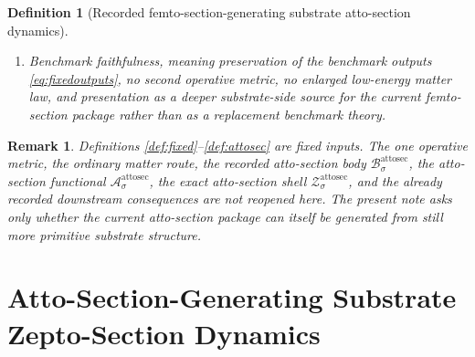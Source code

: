 \documentclass[11pt]{article}
\newcommand{\FemtoSectionShell}[1]{\mathcal Z_{#1}^{\mathrm{femtosec}}}
\newcommand{\AttoSectionBody}[1]{\mathcal B_{#1}^{\mathrm{attosec}}}
\newcommand{\AttoSectionProj}[1]{\Pi_{#1}^{\mathrm{attosec}}}
\newcommand{\AttoSectionFiber}[2]{\mathcal F_{#1}^{\mathrm{attosec}}(#2)}
\newcommand{\AttoSectionFunctional}[1]{\mathscr A_{#1}^{\mathrm{attosec}}}
\newcommand{\AttoSectionShell}[1]{\mathcal Z_{#1}^{\mathrm{attosec}}}
\newtheorem{definition}{Definition}
\newtheorem{remark}{Remark}
\begin{document}
\begin{definition}[Recorded femto-section-generating substrate atto-section dynamics]
\begin{enumerate}
\[\begin{array}{l}
    \AttoSectionFunctional{\sigma}(v)
    =
    \displaystyle\min_{w\in\AttoSectionFiber{\sigma}{\AttoSectionProj{\sigma}(v)}}
    \AttoSectionFunctional{\sigma}(w)
    \end{array}
    \right\},
    \]
    and
    \[
    \AttoSectionProj{\sigma}\big|_{\AttoSectionShell{\sigma}}
    :
    \AttoSectionShell{\sigma}
    \xrightarrow{\cong}
    \FemtoSectionShell{\sigma}
    \]
    is a diffeomorphism.
    \item Benchmark faithfulness, meaning preservation of the benchmark outputs \eqref{eq:fixedoutputs}, no second operative metric, no enlarged low-energy matter law, and presentation as a deeper substrate-side source for the current femto-section package rather than as a replacement benchmark theory.
\end{enumerate}
\end{definition}

\begin{remark}
Definitions \ref{def:fixed}--\ref{def:attosec} are fixed inputs. The one operative metric, the ordinary matter route, the recorded atto-section body \(\AttoSectionBody{\sigma}\), the atto-section functional \(\AttoSectionFunctional{\sigma}\), the exact atto-section shell \(\AttoSectionShell{\sigma}\), and the already recorded downstream consequences are not reopened here. The present note asks only whether the current atto-section package can itself be generated from still more primitive substrate structure.
\end{remark}

\section{Atto-Section-Generating Substrate Zepto-Section Dynamics}
\end{document}

